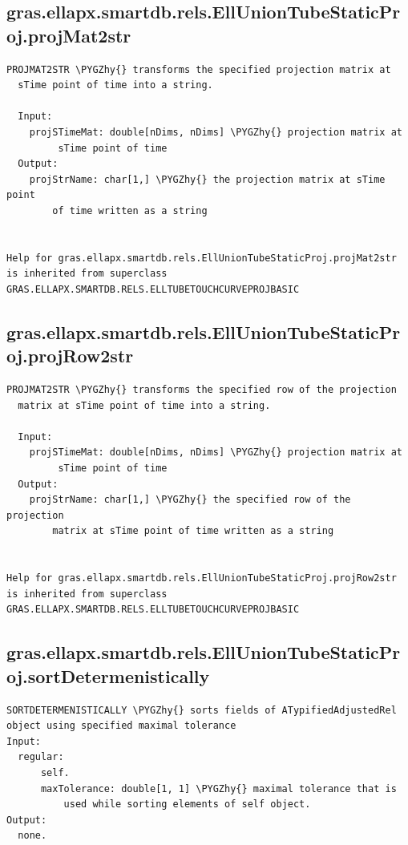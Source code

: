 \documentclass[letterpaper,10pt,english]{sphinxmanual}
\def\PYGZhy{\char`\-}
\begin{document}
\subsection{gras.ellapx.smartdb.rels.EllUnionTubeStaticProj.projMat2str}
\label{chap_functions:gras-ellapx-smartdb-rels-elluniontubestaticproj-projmat2str}
\begin{Verbatim}[commandchars=\\\{\}]
  PROJMAT2STR \PYGZhy{} transforms the specified projection matrix at
  sTime point of time into a string.

  Input:
    projSTimeMat: double[nDims, nDims] \PYGZhy{} projection matrix at
         sTime point of time
  Output:
    projStrName: char[1,] \PYGZhy{} the projection matrix at sTime point
        of time written as a string


Help for gras.ellapx.smartdb.rels.EllUnionTubeStaticProj.projMat2str is inherited from superclass GRAS.ELLAPX.SMARTDB.RELS.ELLTUBETOUCHCURVEPROJBASIC
\end{Verbatim}


\subsection{gras.ellapx.smartdb.rels.EllUnionTubeStaticProj.projRow2str}
\label{chap_functions:gras-ellapx-smartdb-rels-elluniontubestaticproj-projrow2str}
\begin{Verbatim}[commandchars=\\\{\}]
  PROJMAT2STR \PYGZhy{} transforms the specified row of the projection
  matrix at sTime point of time into a string.

  Input:
    projSTimeMat: double[nDims, nDims] \PYGZhy{} projection matrix at
         sTime point of time
  Output:
    projStrName: char[1,] \PYGZhy{} the specified row of the projection
        matrix at sTime point of time written as a string


Help for gras.ellapx.smartdb.rels.EllUnionTubeStaticProj.projRow2str is inherited from superclass GRAS.ELLAPX.SMARTDB.RELS.ELLTUBETOUCHCURVEPROJBASIC
\end{Verbatim}


\subsection{gras.ellapx.smartdb.rels.EllUnionTubeStaticProj.sortDetermenistically}
\label{chap_functions:gras-ellapx-smartdb-rels-elluniontubestaticproj-sortdetermenistically}
\begin{Verbatim}[commandchars=\\\{\}]
SORTDETERMENISTICALLY \PYGZhy{} sorts fields of ATypifiedAdjustedRel
object using specified maximal tolerance
Input:
  regular:
      self.
      maxTolerance: double[1, 1] \PYGZhy{} maximal tolerance that is
          used while sorting elements of self object.
Output:
  none.
\end{Verbatim}
\end{document}
